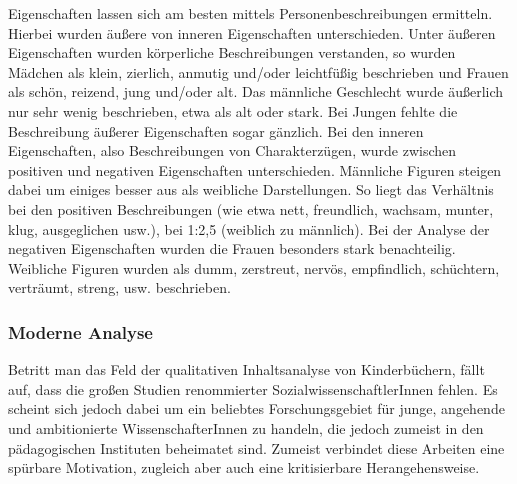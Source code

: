 
        Eigenschaften lassen sich am besten mittels Personenbeschreibungen
        ermitteln. Hierbei wurden äußere von inneren Eigenschaften
        unterschieden. Unter äußeren Eigenschaften wurden körperliche
        Beschreibungen verstanden, so wurden Mädchen als klein, zierlich,
        anmutig und/oder leichtfüßig beschrieben und Frauen als schön, reizend,
        jung und/oder alt. Das männliche Geschlecht wurde äußerlich nur sehr
        wenig beschrieben, etwa als alt oder stark. Bei Jungen fehlte die
        Beschreibung äußerer Eigenschaften sogar gänzlich. Bei den inneren
        Eigenschaften, also Beschreibungen von Charakterzügen, wurde zwischen
        positiven und negativen Eigenschaften unterschieden. Männliche Figuren
        steigen dabei um einiges besser aus als weibliche Darstellungen. So
        liegt das Verhältnis bei den positiven Beschreibungen (wie etwa nett,
        freundlich, wachsam, munter, klug, ausgeglichen usw.), bei 1:2,5
        (weiblich zu männlich). Bei der Analyse der negativen Eigenschaften
        wurden die Frauen besonders stark benachteilig. Weibliche Figuren wurden
        als dumm, zerstreut, nervös, empfindlich, schüchtern, verträumt, streng,
        usw. beschrieben. 

    \subsubsection{Moderne Analyse}

      Betritt man das Feld der qualitativen Inhaltsanalyse von Kinderbüchern,
      fällt auf, dass die großen Studien renommierter SozialwissenschaftlerInnen
      fehlen. Es scheint sich jedoch dabei um ein beliebtes Forschungsgebiet für
      junge, angehende und ambitionierte WissenschafterInnen zu handeln, die
      jedoch zumeist in den pädagogischen Instituten beheimatet sind. Zumeist
      verbindet diese Arbeiten eine spürbare Motivation, zugleich aber auch eine
      kritisierbare Herangehensweise.


